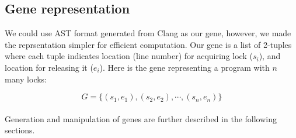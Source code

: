 \subsection{Gene representation}

We could use AST format generated from Clang as our gene, however, we made the reprsentation simpler for efficient computation. Our gene is a list of 2-tuples where each tuple indicates location (line number) for acquiring lock ($s_i$), and location for releasing it ($e_i$). Here is the gene representing a program with $n$ many locks:

\[G = \{(s_{1}, e_{1}), (s_{2}, e_{2}), \cdots , (s_{n}, e_{n}) \}\]
\\
Generation and manipulation of genes are further described in the following sections.